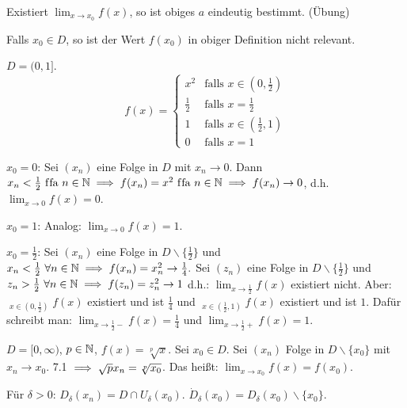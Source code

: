 \documentclass[a4paper,twoside,DIV15,BCOR12mm]{scrbook}
\begin{document}
\begin{bemerkung}
\begin{liste}
\item Existiert $\displaystyle\lim_{x\to x_0}f(x)$, so ist obiges $a$ eindeutig bestimmt. (Übung)
\item Falls $x_0 \in D$, so ist der Wert $f(x_0)$ in obiger Definition nicht relevant.
\end{liste}
\end{bemerkung}

\begin{beispiele}
\item $D= (0,1]$. $$f(x) = \begin{cases} x^2 & \text{falls }x\in(0,\frac{1}{2}) \\ \frac{1}{2} & \text{falls }x=\frac{1}{2} \\ 1 & \text{falls } x \in(\frac{1}{2},1) \\ 0 & \text{falls } x= 1\end{cases}$$

$x_0=0$: Sei $(x_n)$ eine Folge in $D$ mit $x_n \to 0$. Dann $x_n < \frac{1}{2} \text{ f\/fa } n\in\mathbb{N} \implies f(x_n) = x^2 \text{ f\/fa } n\in\mathbb{N} \implies f(x_n) \to 0$, d.h. $\displaystyle\lim_{x\to0}f(x) = 0$.

$x_0 = 1$: Analog: $\displaystyle\lim_{x\to0}f(x) = 1$.

$x_0= \frac{1}{2}$: Sei $(x_n)$ eine Folge in $D\backslash\{\frac{1}{2}\}$ und $x_n < \frac{1}{2} \ \forall n\in\mathbb{N} \implies f(x_n) = x_n^2 \to \frac{1}{4}.$
Sei $(z_n)$ eine Folge in $D\backslash\{\frac{1}{2}\}$ und $z_n > \frac{1}{2} \ \forall n\in\mathbb{N} \implies f(z_n) = z_n^2 \to 1$
d.h.: $\displaystyle\lim_{x\to\frac{1}{2}}f(x)$ existiert nicht. Aber: $\displaystyle\mathop{\lim_{x\to\frac{1}{2}}}_{x\in(0,\frac{1}{2})} f(x)$ existiert und ist $\frac{1}{4}$ und $\displaystyle\mathop{\lim_{x\to\frac{1}{2}}}_{x\in(\frac{1}{2},1)} f(x)$ existiert und ist $1$. Dafür schreibt man: $\displaystyle\lim_{x\to\frac{1}{2}-} f(x)=\frac{1}{4}$ und $\displaystyle\lim_{x\to\frac{1}{2}+} f(x)=1$.

\item $D=[0,\infty)$, $p\in\mathbb{N}$, $f(x) = \sqrt[p]{x}$. Sei $x_0 \in D$. Sei $(x_n)$ Folge in $D\backslash\{x_0\}$ mit $x_n \to x_0$. 7.1 $\implies \sqrt{p}{x_n} = \sqrt[p]{x_0}$. Das heißt: $\displaystyle\lim_{x\to x_0 } f(x) = f(x_0)$.
\end{beispiele}

\begin{vereinbarung}
Für $\delta >0$: $D_\delta(x_n) = D \cap U_\delta(x_0)$. $\dot D_\delta(x_0) = D_\delta(x_0) \backslash \{x_0\}$.
\end{vereinbarung}
\end{document}

